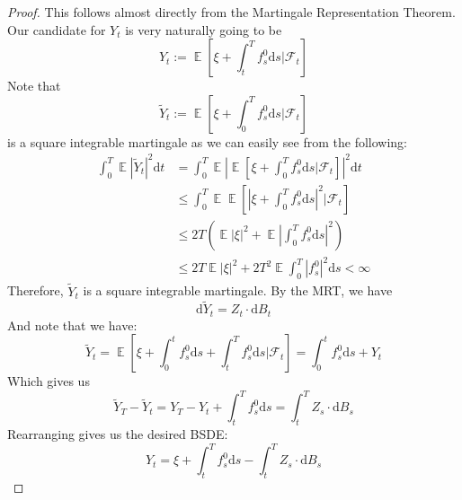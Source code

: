 \documentclass{amsart}
\newcommand{\cF}{\mathcal{F}}
\DeclareMathOperator{\ee}{\mathbb E}
\theoremstyle{definition}
\theoremstyle{remark}
\numberwithin{equation}{section}
\begin{document}
\begin{proof}
    This follows almost directly from the Martingale Representation Theorem. 
    Our candidate for $Y_t$ is very naturally going to be 
    \begin{equation}
        Y_t := \ee \left[
            \xi + \int_t^T f_s^0 \mathrm{d} s \bigg| \cF_t
        \right]
    \end{equation}
    Note that 
    \[
    \tilde{Y}_t := \ee \left[
        \xi + \int_0^T f_s^0 \mathrm{d} s \bigg| \cF_t
    \right]
    \]
    is a square integrable martingale as we can easily see from the following:
    \begin{align*}
        \int_0^T \ee |\tilde{Y}_t|^2 \mathrm{d} t & = \int_0^T \ee \left| \ee \left[
            \xi + \int_0^T f_s^0 \mathrm{d} s \bigg| \cF_t \right] \right|^2 \mathrm{d} t \\
            &\le \int_0^T \ee \ee \left[
                \left|
                    \xi + \int_0^T f_s^0 \mathrm{d}s 
                \right|^2 \bigg| \cF_t
            \right]\\
            &\le 2T \left(
                \ee |\xi|^2 + \ee \left|\int_0^T f_s^0 \mathrm{d} s \right|^2 
            \right) \\
            &\le 2T \ee |\xi|^2 + 2T^2 \ee \int_0^T |f_s^0|^2 \mathrm{d} s < \infty
    \end{align*}
    Therefore, $\tilde{Y}_t$ is a square integrable martingale. By the MRT, we have
    \[
    \mathrm{d} \tilde{Y}_t = Z_t \cdot \mathrm{d}B_t
    \]
    And note that we have:
    \[
    \tilde{Y}_t = \ee \left[
        \xi + \int_0^t f_s^0 \mathrm{d} s + \int_t^T f_s^0 \mathrm{d} s \bigg| \cF_t
    \right] = \int_0^t f_s^0 \mathrm{d} s + Y_t
    \]
    Which gives us
    \[
    \tilde{Y}_T - \tilde{Y}_t = Y_T - Y_t + \int_t^T f_s^0 \mathrm{d} s = \int_t^T Z_s \cdot \mathrm{d}B_s
    \]
    Rearranging gives us the desired BSDE:
    \[
    Y_t = \xi + \int_t^T f_s^0 \mathrm{d} s - \int_t^T Z_s \cdot \mathrm{d}B_s
    \]
\end{proof}
\end{document}
